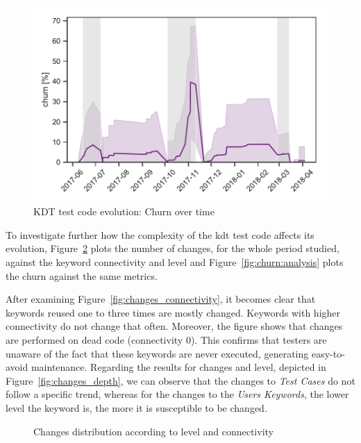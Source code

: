 \begin{figure}
\centering
\includegraphics[width=0.7\columnwidth]{figures/evolution/time_series_churn.pdf}
\caption{KDT test code evolution: Churn over time}  
\label{fig:churn}
\end{figure}

To investigate further how the complexity of the \gls{kdt} test code affects its evolution, Figure~\ref{fig:changes} plots the number of changes, for the whole period studied, against the keyword connectivity and level and Figure~\ref{fig:churn:analysis} plots the churn against the same metrics.

After examining Figure~\ref{fig:changes_connectivity}, it becomes clear that keywords reused one to three times are mostly changed. Keywords with higher connectivity do not change that often. Moreover, the figure shows that changes are performed on dead code (connectivity 0). This confirms that testers are unaware of the fact that these keywords are never executed, generating easy-to-avoid maintenance. Regarding the results for changes and level, depicted in Figure~\ref{fig:changes_depth}, we can observe that the changes to \emph{Test Cases} do not follow a specific trend, whereas for the changes to the \emph{Users Keywords}, the lower level the keyword is, the more it is susceptible to be changed.

\begin{figure}
\centering
{}
\caption{Changes distribution according to level and connectivity}  
\label{fig:changes}
\end{figure}


